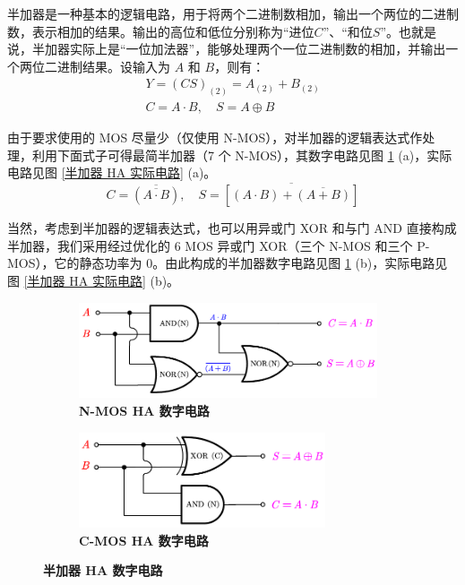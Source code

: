 \documentclass[UTF8]{report}
\theoremstyle{MyLineTheoremStyle} %
\theoremstyle{MyBlockTheoremStyle} %
\theoremstyle{MySubsubsectionStyle} %
\begin{document}
半加器是一种基本的逻辑电路，用于将两个二进制数相加，输出一个两位的二进制数，表示相加的结果。输出的高位和低位分别称为“进位$C$”、“和位$S$”。也就是说，半加器实际上是“一位加法器”，能够处理两个一位二进制数的相加，并输出一个两位二进制结果。设输入为 $A$ 和 $B$，则有：
\begin{gather}
    Y = (C S)_{(2)} = A_{(2)} + B_{(2)}
    \\
    C = A \cdot B,\quad S = A \oplus B
\end{gather}

由于要求使用的 MOS 尽量少（仅使用 N-MOS），对半加器的逻辑表达式作处理，利用下面式子可得最简半加器（7 个 N-MOS），其数字电路见图 \ref{半加器 HA 数字电路} (a)，实际电路见图 \ref{半加器 HA 实际电路} (a)。
\begin{equation}
    C = \overline{(\overline{A\cdot B})},\quad S = \overline{\left[(A \cdot B) + \overline{(A + B)}\right]}
\end{equation}

当然，考虑到半加器的逻辑表达式，也可以用异或门 XOR 和与门 AND 直接构成半加器，我们采用经过优化的 6 MOS 异或门 XOR（三个 N-MOS 和三个 P-MOS），它的静态功率为 0。由此构成的半加器数字电路见图 \ref{半加器 HA 数字电路} (b)，实际电路见图 \ref{半加器 HA 实际电路} (b)。

\begin{figure}[H]\centering
\begin{subfigure}[t]{0.5\columnwidth}\centering
    \includegraphics[height=80pt]{assets/5/NMOS 半加器数字电路.pdf}
    \caption{\bfseries N-MOS HA 数字电路}
\end{subfigure}\hfill
\begin{subfigure}[t]{0.5\columnwidth}\centering
    \includegraphics[height=80pt]{assets/5/CMOS 半加器数字电路.pdf}
    \caption{\bfseries C-MOS HA 数字电路 }
\end{subfigure}
\caption{\bfseries 半加器 HA 数字电路 }\label{半加器 HA 数字电路}
\end{figure}
\end{document}
